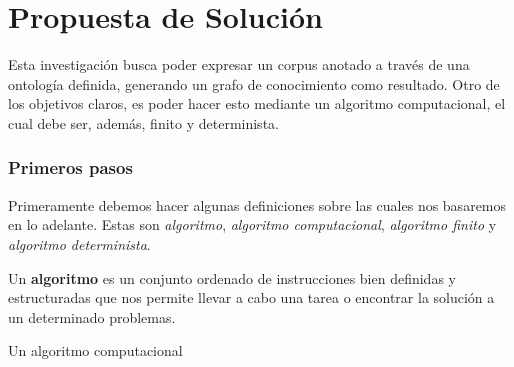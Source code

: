 \chapter{Propuesta de Solución}\label{chapter:proposed-solution}
Esta investigación busca poder expresar un corpus anotado a través de una ontología definida, generando un grafo de conocimiento como resultado. Otro de los objetivos claros, es poder hacer esto mediante un algoritmo computacional, el cual debe ser, además, finito y determinista. 


\subsection{Primeros pasos}
Primeramente debemos hacer algunas definiciones sobre las cuales nos basaremos en lo adelante. Estas son {\it algoritmo}, {\it algoritmo computacional}, {\it algoritmo finito} y {\it algoritmo determinista}.

\begin{definition}
	Un \textbf{algoritmo} es un conjunto ordenado de instrucciones bien definidas y estructuradas que nos permite llevar a cabo una tarea o encontrar la solución a un determinado problemas.
\end{definition}

\begin{definition}
	Un algoritmo computacional
\end{definition}

\begin{definition}
	
\end{definition}

\begin{definition}
	
\end{definition}